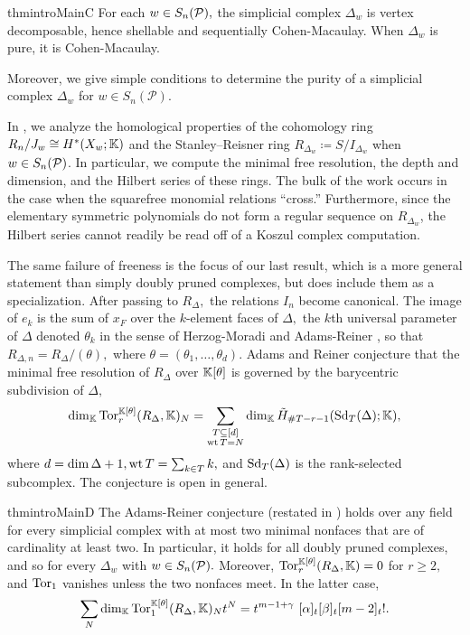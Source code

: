 \begin{restatable}[]{thmintro}{MainC}
\label{thm:main-C}
    For each $w\in S_n(\mathcal{P}),$ the simplicial complex $\Delta_w$ is vertex decomposable, hence shellable and sequentially Cohen-Macaulay. When $\Delta_w$ is pure, it is Cohen-Macaulay. 
\end{restatable}

Moreover, we give simple conditions to determine the purity of a simplicial complex $\Delta_w$ for $w\in S_n(\mathcal P)$.


In , we analyze the homological properties of the cohomology ring $R_n/J_w \cong H^*(X_w;\mathbb{K})$ and the Stanley--Reisner ring $R_{\Delta_w} \coloneqq S/I_{\Delta_w}$ when $w\in S_n(\mathcal{P})$. In particular, we compute the minimal free resolution, the depth and dimension, and the Hilbert series of these rings. The bulk of the work occurs in the case when the squarefree monomial relations ``cross.'' Furthermore, since the elementary symmetric polynomials do not form a regular sequence on $R_{\Delta_w}$, the Hilbert series cannot readily be read off of a Koszul complex computation.

The same failure of freeness is the focus of our last result, which is a more general statement than simply doubly pruned complexes, but does include them as a specialization. After passing to $R_\Delta,$ the relations $I_n$ become canonical. The image of $e_k$ is the sum of $x_F$ over the $k$-element faces of $\Delta,$ the $k$th universal parameter of $\Delta$ denoted $\theta_k$ in the sense of Herzog-Moradi \cite{herzog-moradi} and Adams-Reiner \cite{adams-reiner}, so that $R_{\Delta,n} = R_{\Delta}/(\theta),$ where $\theta = (\theta_1,\ldots,\theta_d).$ Adams and Reiner conjecture \cite[Conj.~6.1]{adams-reiner} that the minimal free resolution of $R_\Delta$ over $\mathbb{K}[\theta]$ is governed by the barycentric subdivision of $\Delta,$
\[
\dim_{\mathbb{K}}
\operatorname{Tor}_r^{\mathbb{K}[\theta]}(R_\Delta,\mathbb{K})_N
=
\sum_{
\substack{
T\subseteq[d] \\
\operatorname{wt} T = N
}
}
\dim_{\mathbb{K}}\tilde{H}_{\#T-r-1}(\operatorname{Sd}_T(\Delta);\mathbb{K}),
\]
where $d = \dim\Delta +1, \operatorname{wt} T = \sum_{k\in T}k,$ and $\operatorname{Sd}_T(\Delta)$ is the rank-selected subcomplex. The conjecture is open in general.

\begin{restatable}[]{thmintro}{MainD}
\label{thm:main-D}
        The Adams-Reiner conjecture (restated in ) holds over any field for every simplicial complex with at most two minimal nonfaces that are of cardinality at least two. In particular, it holds for all doubly pruned complexes, and so for every $\Delta_w$ with $w\in S_n(\mathcal{P}).$ Moreover, $\operatorname{Tor}_r^{\mathbb{K}[\theta]}(R_\Delta,\mathbb{K}) = 0$ for $r\geq 2,$ and $\operatorname{Tor}_1$ vanishes unless the two nonfaces meet. In the latter case,
    \[
    \sum_N
    \dim_{\mathbb{K}} \operatorname{Tor}_1^{\mathbb{K}[\theta]}(R_\Delta,\mathbb{K})_N t^N 
    = t^{m-1+\gamma}~[\alpha]_t[\beta]_t[m-2]_t!.
    \]
\end{restatable}


